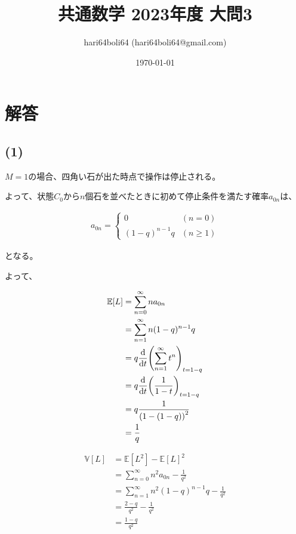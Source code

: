 \documentclass[a4paper, 10pt, dvipdfmx]{jlreq}
\begin{document}
\title{共通数学 2023年度 大問3}
\author{hari64boli64 (hari64boli64@gmail.com)}
\date{\today}
\maketitle

\section{解答}

\subsection*{(1)}

$M=1$の場合、四角い石が出た時点で操作は停止される。

よって、状態$C_0$から$n$個石を並べたときに初めて停止条件を満たす確率$a_{0n}$は、

\begin{align*}
  a_{0n} =
  \begin{cases}
    0            & (n = 0   ) \\
    (1-q)^{n-1}q & (n \geq 1)
  \end{cases}
\end{align*}

となる。

よって、

\begin{align*}
  \mathbb{E}[L] & = \sum_{n=0}^{\infty} na_{0n}                   \\
                & = \sum_{n=1}^{\infty} n(1-q)^{n-1}q             \\
                & = q\dv{t}\qty(\sum_{n=1}^{\infty}{t^n})_{t=1-q} \\
                & = q\dv{t}\qty(\frac{1}{1-t})_{t=1-q}            \\
                & = q\frac{1}{\qty(1-(1-q))^2}                    \\
                & = \frac{1}{q}
\end{align*}


\begin{align*}
  \mathbb{V}[L] & = \mathbb{E}[L^2] - \mathbb{E}[L]^2                   \\
                & = \sum_{n=0}^{\infty} n^2a_{0n} - \frac{1}{q^2}       \\
                & = \sum_{n=1}^{\infty} n^2(1-q)^{n-1}q - \frac{1}{q^2} \\
                & = \frac{2-q}{q^2}-\frac{1}{q^2}                       \\
                & = \frac{1-q}{q^2}
\end{align*}
\end{document}

